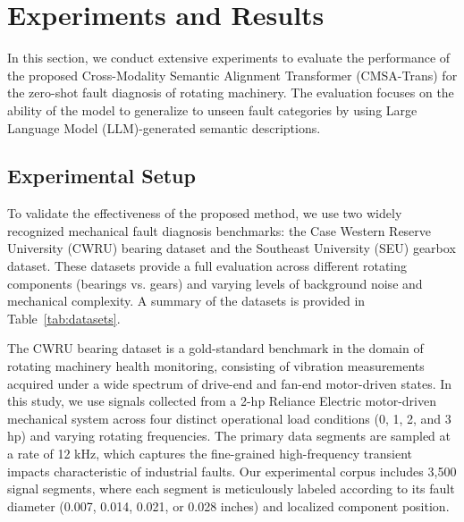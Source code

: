 \documentclass[journal]{IEEEtran}
\begin{document}
\section{Experiments and Results}
\label{sec:experiments}

In this section, we conduct extensive experiments to evaluate the performance of the proposed Cross-Modality Semantic Alignment Transformer (CMSA-Trans) for the zero-shot fault diagnosis of rotating machinery. The evaluation focuses on the ability of the model to generalize to unseen fault categories by using Large Language Model (LLM)-generated semantic descriptions.

\subsection{Experimental Setup}

To validate the effectiveness of the proposed method, we use two widely recognized mechanical fault diagnosis benchmarks: the Case Western Reserve University (CWRU) bearing dataset and the Southeast University (SEU) gearbox dataset. These datasets provide a full evaluation across different rotating components (bearings vs. gears) and varying levels of background noise and mechanical complexity. A summary of the datasets is provided in Table~\ref{tab:datasets}.



The CWRU bearing dataset is a gold-standard benchmark in the domain of rotating machinery health monitoring, consisting of vibration measurements acquired under a wide spectrum of drive-end and fan-end motor-driven states. In this study, we use signals collected from a 2-hp Reliance Electric motor-driven mechanical system across four distinct operational load conditions (0, 1, 2, and 3 hp) and varying rotating frequencies. The primary data segments are sampled at a rate of 12 kHz, which captures the fine-grained high-frequency transient impacts characteristic of industrial faults. Our experimental corpus includes 3,500 signal segments, where each segment is meticulously labeled according to its fault diameter (0.007, 0.014, 0.021, or 0.028 inches) and localized component position.
\end{document}
